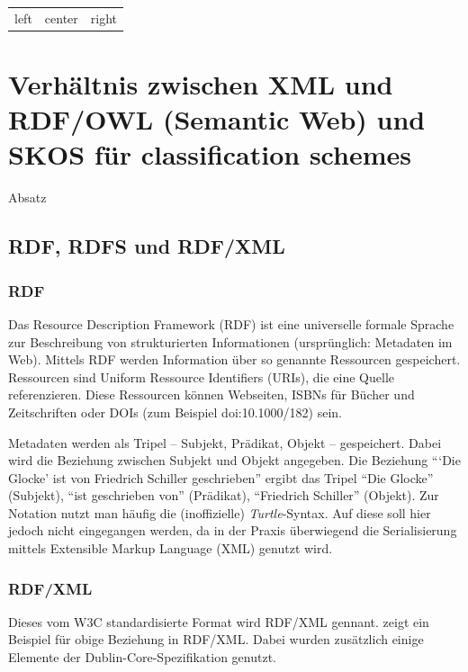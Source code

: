 \begin{tabular}{|c|c|c|}
left & center & right\\
\end{tabular}


	\newpage
	
	\section{Verhältnis zwischen XML und RDF/OWL (Semantic Web) und SKOS für classification schemes}
	Absatz

	\subsection{RDF, RDFS und RDF/XML}
	\subsubsection{RDF}
	Das Resource Description Framework (RDF) ist eine universelle formale Sprache zur Beschreibung von strukturierten Informationen (ursprünglich: Metadaten im Web). Mittels RDF werden Information über so genannte Ressourcen gespeichert. Ressourcen sind Uniform Ressource Identifiers (URIs), die eine Quelle referenzieren. Diese Ressourcen können Webseiten, ISBNs für Bücher und Zeitschriften oder DOIs (zum Beispiel doi:10.1000/182) sein.
	
	Metadaten werden als Tripel -- Subjekt, Prädikat, Objekt -- gespeichert. Dabei wird die Beziehung zwischen Subjekt und Objekt angegeben. Die Beziehung \enquote{\enquote{Die Glocke} ist von Friedrich Schiller geschrieben} ergibt das Tripel \enquote{Die Glocke} (Subjekt), \enquote{ist geschrieben von} (Prädikat), \enquote{Friedrich Schiller} (Objekt). Zur Notation nutzt man häufig die (inoffizielle) \emph{Turtle}-Syntax. %
	Auf diese soll hier jedoch nicht eingegangen werden, da in der Praxis überwiegend die Serialisierung mittels Extensible Markup Language (XML) genutzt wird.
	
	\subsubsection{RDF/XML}
	Dieses vom W3C standardisierte Format wird RDF/XML gennant.  zeigt ein Beispiel für obige Beziehung in RDF/XML. Dabei wurden zusätzlich einige Elemente der Dublin-Core-Spezifikation genutzt.
	

